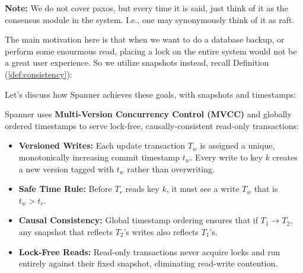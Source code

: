     \begin{Note}
    \textbf{Note:} We do not cover paxos, but every time it is said, just think of it as the consensus module in the system. I.e., one may 
    synonymously think of it as raft.
    \end{Note}
    \noindent
    The main motivation here is that when we want to do a database backup, or perform some enourmous read, placing a lock on the entire system would not be a 
    great user experience. So we utilize snapshots instead, recall Definition (\ref{def:consistency}):

    \newpage 

    \noindent
    Let's discuss how Spanner achieves these goals, with snapshots and timestamps:
    \begin{Def}

        \label{def:spanner}
        Spanner uses \textbf{Multi-Version Concurrency Control (MVCC)} and globally ordered timestamps to serve lock-free, causally-consistent read-only transactions:
        
        \begin{itemize}
          \item \textbf{Versioned Writes:} Each update transaction $T_w$ is assigned a unique, monotonically increasing commit timestamp $t_w$.  Every write to key $k$ creates a new version tagged with $t_w$ rather than overwriting.
          \item \textbf{Safe Time Rule:} Before $T_r$ reads key $k$, it must see a write $T_w$ that is $t_w > t_r$.
          \item \textbf{Causal Consistency:} Global timestamp ordering ensures that if $T_1\to T_2$, any snapshot that reflects $T_2$'s writes also reflects $T_1$'s.
          \item \textbf{Lock-Free Reads:} Read-only transactions never acquire locks and run entirely against their fixed snapshot, eliminating read-write contention.
        \end{itemize}
        \end{Def}
        
        \noindent
    \noindent
    

